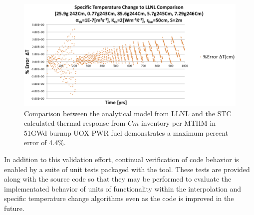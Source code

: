 \begin{figure}[htp!]
\begin{center}
\includegraphics[width=\columnwidth]{./chapters/methodology/thermal_models/CmPercentError.eps}
\end{center}
\caption{Comparison between the analytical model from LLNL and the \gls{STC} 
calculated thermal response from $Cm$ inventory per MTHM in 51GWd burnup UOX 
PWR fuel demonstrates a maximum percent error of 4.4\%.}
\label{fig:CmPercentError}
\end{figure}
In addition to this validation effort, continual verification of code behavior 
is enabled by a suite of unit tests packaged with the tool. These tests are 
provided along with the source code so that they may be performed to evaluate 
the implementated behavior of units of functionality within the interpolation 
and specific temperature change algorithms even as the code is improved in the 
future.  
